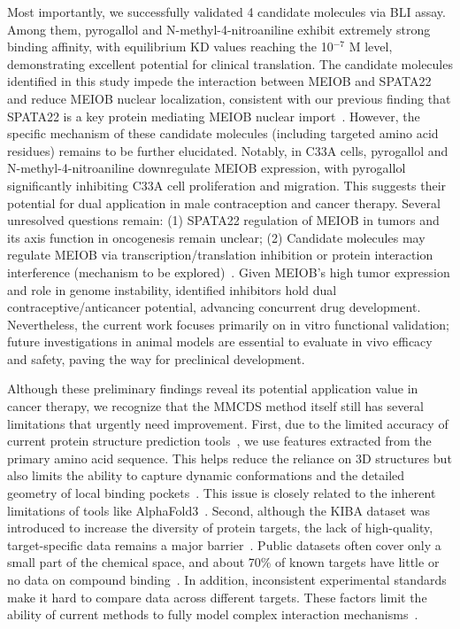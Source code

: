 \documentclass[unnumsec,webpdf,contemporary,large]{oup-authoring-template}%
\theoremstyle{thmstyleone}%
\theoremstyle{thmstyletwo}%
\theoremstyle{thmstylethree}%
\begin{document}
Most importantly, we successfully validated 4 candidate molecules via BLI assay. Among them, pyrogallol and N-methyl-4-nitroaniline exhibit extremely strong binding affinity, with equilibrium $\text{KD}$ values reaching the 10$^{-7}$ M level, demonstrating excellent potential for clinical translation. The candidate molecules identified in this study impede the interaction between MEIOB and SPATA22 and reduce MEIOB nuclear localization, consistent with our previous finding that SPATA22 is a key protein mediating MEIOB nuclear import~\cite{10}. However, the specific mechanism of these candidate molecules (including targeted amino acid residues) remains to be further elucidated. Notably, in C33A cells, pyrogallol and N-methyl-4-nitroaniline downregulate MEIOB expression, with pyrogallol significantly inhibiting C33A cell proliferation and migration. This suggests their potential for dual application in male contraception and cancer therapy. Several unresolved questions remain: (1) SPATA22 regulation of MEIOB in tumors and its axis function in oncogenesis remain unclear; (2) Candidate molecules may regulate MEIOB via transcription/translation inhibition or protein interaction interference (mechanism to be explored)~\cite{18}. Given MEIOB's high tumor expression and role in genome instability, identified inhibitors hold dual contraceptive/anticancer potential, advancing concurrent drug development. Nevertheless, the current work focuses primarily on in vitro functional validation; future investigations in animal models are essential to evaluate in vivo efficacy and safety, paving the way for preclinical development.

Although these preliminary findings reveal its potential application value in cancer therapy, we recognize that the MMCDS method itself still has several limitations that urgently need improvement. First, due to the limited accuracy of current protein structure prediction tools~\cite{59,60}, we use features extracted from the primary amino acid sequence. This helps reduce the reliance on 3D structures but also limits the ability to capture dynamic conformations and the detailed geometry of local binding pockets~\cite{61}. This issue is closely related to the inherent limitations of tools like AlphaFold3~\cite{62}. Second, although the KIBA dataset was introduced to increase the diversity of protein targets, the lack of high-quality, target-specific data remains a major barrier~\cite{63,64}. Public datasets often cover only a small part of the chemical space, and about 70\% of known targets have little or no data on compound binding~\cite{65}. In addition, inconsistent experimental standards make it hard to compare data across different targets. These factors limit the ability of current methods to fully model complex interaction mechanisms~\cite{66}.
\end{document}
